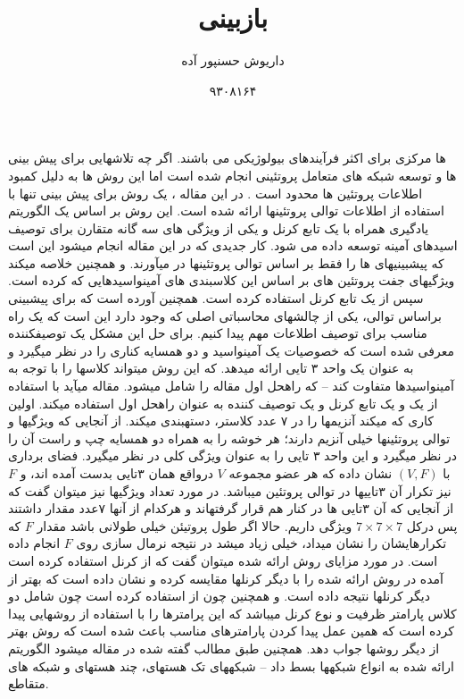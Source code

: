 \documentclass[10pt,a4paper]{article}
\newcommand{\نیمفاصله}{\halfspace}
\renewcommand{\ }{\halfspace}
\begin{document}
\title{بازبینی\\
}
\author{داریوش حسن\ پور آده}
\date{۹۳۰۸۱۶۴}
\maketitle
\null
\vfill
\thispagestyle{empty}
\setcounter{page}{0}
\newpage
{} ها مرکزی برای اکثر فرآیندهای بیولوژیکی می باشند. اگر چه تلاشهایی برای پیش بینی  ها و توسعه شبکه های متعامل پروتئینی انجام شده است اما این روش ها به دلیل کمبود اطلاعات پروتئین ها  محدود است . در این مقاله ، یک روش برای پیش بینی  تنها با استفاده از اطلاعات توالی پروتئین\ ها ارائه شده است. این روش بر اساس یک الگوریتم یادگیری  همراه با یک تابع کرنل و یکی از ویژگی های سه گانه متقارن برای توصیف اسیدهای آمینه توسعه داده می شود.
کار جدیدی که در این مقاله انجام می\ شود این است که پیش\ بینی\ های  ها را فقط بر اساس توالی پروتئین\ ها در می\ آورند. و همچنین خلاصه می\ کند ویژگی\ های جفت پروتئین های بر اساس این کلاس\ بندی های آمینواسیدهایی که کرده است. سپس از یک تابع کرنل استفاده کرده است. همچنین آورده است که برای پیش\ بینی  براساس توالی، یکی از چالش\ های محاسباتی اصلی که وجود دارد این است که یک راه مناسب برای توصیف اطلاعات مهم  پیدا کنیم. برای حل این مشکل یک توصیف\ کننده  معرفی شده است که خصوصیات یک آمینواسید و دو همسایه کناری را در نظر میگیرد و به عنوان یک واحد ۳ تایی ارائه میدهد. که این روش می\ تواند کلاس\ ها را با توجه به آمینواسید\ ها متفاوت کند -- که راه\ حل اول مقاله را شامل می\ شود.
مقاله می\ آید با استفاده از یک  و یک تابع کرنل و یک توصیف کننده به عنوان راه\ حل اول استفاده می\ کند. اولین کاری که میکند آنزیم\ ها را در ۷ عدد کلاستر، دسته\ بندی می\ کند. از آنجایی که ویژگی\ ها و توالی پروتئین\ ها خیلی آنزیم دارند؛ هر خوشه را به همراه دو همسایه چپ و راست آن را در نظر می\ گیرد و این واحد ۳ تایی را به عنوان ویژگی کلی در نظر می\ گیرد. فضای برداری با
$(V, F)$
نشان داده که هر عضو مجموعه
$V$
درواقع همان ۳تایی بدست آمده اند، و
$F$
نیز تکرار آن ۳تایی\ ها در توالی پروتئین می\ باشد. در مورد تعداد ویژگی\ ها نیز می\ توان گفت که از آنجایی که آن ۳تایی ها در کنار هم قرار گرفته\ اند و هرکدام از آنها ۷عدد مقدار داشتند پس درکل
$7 \times 7 \times 7$
ویژگی داریم.
حالا اگر طول پروتیئن خیلی طولانی باشد مقدار
$F$
که تکرارهایشان را نشان میداد، خیلی زیاد می\ شد در نتیجه نرمال سازی روی
$F$
انجام داده است.
در مورد مزایای روش ارائه شده می\ توان گفت که از
کرنل استفاده کرده است آمده در روش ارائه شده را با دیگر کرنل\ ها مقایسه کرده و نشان داده است که
بهتر از دیگر کرنل\ ها نتیجه داده است. و همچنین چون از
استفاده کرده است چون شامل دو کلاس پارامتر ظرفیت و نوع کرنل می\ باشد که این پرامترها را با استفاده از روش\ هایی پیدا کرده است که همین عمل پیدا کردن پارامترهای مناسب باعث شده است که روش بهتر از دیگر روش\ ها جواب دهد. همچنین طبق مطالب گفته شده در مقاله می\ شود الگوریتم ارائه شده به انواع شبکه\ ها بسط داد -- شبکه\ های تک هسته\ ای، چند هسته\ ای و شبکه های متقاطع.
\end{document}
